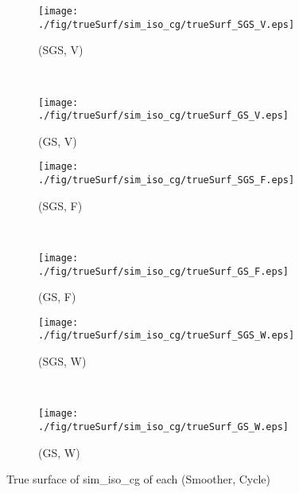 \begin{figure}
  \centering
  \begin{subfigure}[h]{0.45\textwidth}
    \texttt{[image: ./fig/trueSurf/sim\_iso\_cg/trueSurf\_SGS\_V.eps]}
    \caption{(SGS, V)}
  \end{subfigure}
  ~
  \begin{subfigure}[h]{0.45\textwidth}
    \texttt{[image: ./fig/trueSurf/sim\_iso\_cg/trueSurf\_GS\_V.eps]}
    \caption{(GS, V)}
  \end{subfigure}
  
  \begin{subfigure}[h]{0.45\textwidth}
    \texttt{[image: ./fig/trueSurf/sim\_iso\_cg/trueSurf\_SGS\_F.eps]}
    \caption{(SGS, F)}
  \end{subfigure}
  ~
  \begin{subfigure}[h]{0.45\textwidth}
    \texttt{[image: ./fig/trueSurf/sim\_iso\_cg/trueSurf\_GS\_F.eps]}
    \caption{(GS, F)}
  \end{subfigure}
  
  \begin{subfigure}[h]{0.45\textwidth}
    \texttt{[image: ./fig/trueSurf/sim\_iso\_cg/trueSurf\_SGS\_W.eps]}
    \caption{(SGS, W)}
  \end{subfigure}
  ~
  \begin{subfigure}[h]{0.45\textwidth}
    \texttt{[image: ./fig/trueSurf/sim\_iso\_cg/trueSurf\_GS\_W.eps]}
    \caption{(GS, W)}
  \end{subfigure}
  \caption{True surface of sim\_iso\_cg of each (Smoother, Cycle)}\label{fig:trueSurf_sim_iso_cg}
\end{figure}

